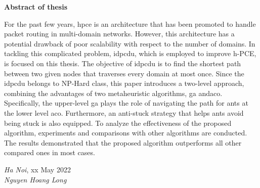 \begin{center}
	{\fontsize{14}{16}\selectfont \textbf{Abstract of thesis}}
\end{center}

For the past few years, \gls{hpce} is an architecture that has been promoted to handle packet routing in multi-domain networks. However, this architecture has a potential drawback of poor scalability with
respect to the number of domains. In tackling this complicated problem, \acrfull{idpcdu}, which is employed to improve h-PCE, is focused on this thesis. The objective of \gls{idpcdu} is to find the shortest path between two given nodes that traverses every domain at most once. Since the \gls{idpcdu} belongs to NP-Hard class, this paper introduces a two-level approach, combining the advantages of two metaheuristic algorithms, \acrfull{ga} and\acrfull{aco}. Specifically, the upper-level \gls{ga} plays the role of navigating the path for ants at the lower level \gls{aco}. Furthermore, an anti-stuck strategy that helps ants avoid being stuck is also equipped. To analyze the effectiveness of the proposed algorithm, experiments and comparisons with other algorithms are conducted. The results demonstrated that the proposed algorithm outperforms all other compared ones in most cases.

\begin{flushright}
	\begin{minipage}[t]{0.5\textwidth}
		\begin{center}
			\textit{Ha Noi}, xx May 2022\\[2cm]
		
			\textit{Nguyen Hoang Long}
		\end{center}
	\end{minipage}
\end{flushright}
\pagebreak